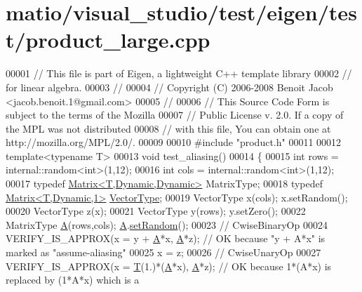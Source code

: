 \hypertarget{matio_2visual__studio_2test_2eigen_2test_2product__large_8cpp_source}{}\section{matio/visual\+\_\+studio/test/eigen/test/product\+\_\+large.cpp}
\label{matio_2visual__studio_2test_2eigen_2test_2product__large_8cpp_source}

\begin{DoxyCode}
00001 \textcolor{comment}{// This file is part of Eigen, a lightweight C++ template library}
00002 \textcolor{comment}{// for linear algebra.}
00003 \textcolor{comment}{//}
00004 \textcolor{comment}{// Copyright (C) 2006-2008 Benoit Jacob <jacob.benoit.1@gmail.com>}
00005 \textcolor{comment}{//}
00006 \textcolor{comment}{// This Source Code Form is subject to the terms of the Mozilla}
00007 \textcolor{comment}{// Public License v. 2.0. If a copy of the MPL was not distributed}
00008 \textcolor{comment}{// with this file, You can obtain one at http://mozilla.org/MPL/2.0/.}
00009 
00010 \textcolor{preprocessor}{#include "product.h"}
00011 
00012 \textcolor{keyword}{template}<\textcolor{keyword}{typename} T>
00013 \textcolor{keywordtype}{void} test\_aliasing()
00014 \{
00015   \textcolor{keywordtype}{int} rows = internal::random<int>(1,12);
00016   \textcolor{keywordtype}{int} cols = internal::random<int>(1,12);
00017   \textcolor{keyword}{typedef} \hyperlink{group___core___module_class_eigen_1_1_matrix}{Matrix<T,Dynamic,Dynamic>} MatrixType;
00018   \textcolor{keyword}{typedef} \hyperlink{group___core___module_class_eigen_1_1_matrix}{Matrix<T,Dynamic,1>} \hyperlink{struct_vector_type}{VectorType};
00019   VectorType x(cols); x.setRandom();
00020   VectorType z(x);
00021   VectorType y(rows); y.setZero();
00022   MatrixType \hyperlink{group___core___module_class_eigen_1_1_matrix}{A}(rows,cols); \hyperlink{group___core___module_class_eigen_1_1_matrix}{A}.\hyperlink{class_eigen_1_1_plain_object_base_af0e576a0e1aefc9ee346de44cc352ba3}{setRandom}();
00023   \textcolor{comment}{// CwiseBinaryOp}
00024   VERIFY\_IS\_APPROX(x = y + \hyperlink{group___core___module_class_eigen_1_1_matrix}{A}*x, \hyperlink{group___core___module_class_eigen_1_1_matrix}{A}*z);     \textcolor{comment}{// OK because "y + A*x" is marked as "assume-aliasing"}
00025   x = z;
00026   \textcolor{comment}{// CwiseUnaryOp}
00027   VERIFY\_IS\_APPROX(x = \hyperlink{group___sparse_core___module}{T}(1.)*(\hyperlink{group___core___module_class_eigen_1_1_matrix}{A}*x), \hyperlink{group___core___module_class_eigen_1_1_matrix}{A}*z); \textcolor{comment}{// OK because 1*(A*x) is replaced by (1*A*x) which is a
}
\end{DoxyCode}
